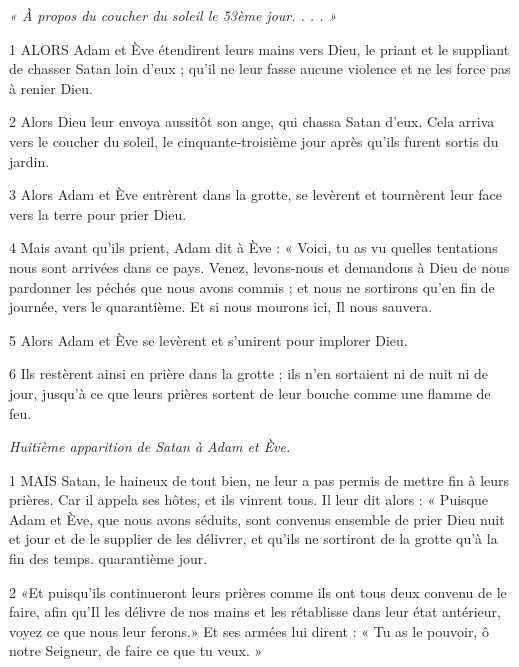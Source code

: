 
\par \textit{« À propos du coucher du soleil le 53ème jour. . . . »}

\par 1 ALORS Adam et Ève étendirent leurs mains vers Dieu, le priant et le suppliant de chasser Satan loin d'eux ; qu'il ne leur fasse aucune violence et ne les force pas à renier Dieu.

\par 2 Alors Dieu leur envoya aussitôt son ange, qui chassa Satan d'eux. Cela arriva vers le coucher du soleil, le cinquante-troisième jour après qu'ils furent sortis du jardin.

\par 3 Alors Adam et Ève entrèrent dans la grotte, se levèrent et tournèrent leur face vers la terre pour prier Dieu.

\par 4 Mais avant qu'ils prient, Adam dit à Ève : « Voici, tu as vu quelles tentations nous sont arrivées dans ce pays. Venez, levons-nous et demandons à Dieu de nous pardonner les péchés que nous avons commis ; et nous ne sortirons qu'en fin de journée, vers le quarantième. Et si nous mourons ici, Il nous sauvera.

\par 5 Alors Adam et Ève se levèrent et s'unirent pour implorer Dieu.

\par 6 Ils restèrent ainsi en prière dans la grotte ; ils n'en sortaient ni de nuit ni de jour, jusqu'à ce que leurs prières sortent de leur bouche comme une flamme de feu.


\par \textit{Huitième apparition de Satan à Adam et Ève.}

\par 1 MAIS Satan, le haineux de tout bien, ne leur a pas permis de mettre fin à leurs prières. Car il appela ses hôtes, et ils vinrent tous. Il leur dit alors : « Puisque Adam et Ève, que nous avons séduits, sont convenus ensemble de prier Dieu nuit et jour et de le supplier de les délivrer, et qu'ils ne sortiront de la grotte qu'à la fin des temps. quarantième jour.

\par 2 «Et puisqu'ils continueront leurs prières comme ils ont tous deux convenu de le faire, afin qu'Il les délivre de nos mains et les rétablisse dans leur état antérieur, voyez ce que nous leur ferons.» Et ses armées lui dirent : « Tu as le pouvoir, ô notre Seigneur, de faire ce que tu veux. »

